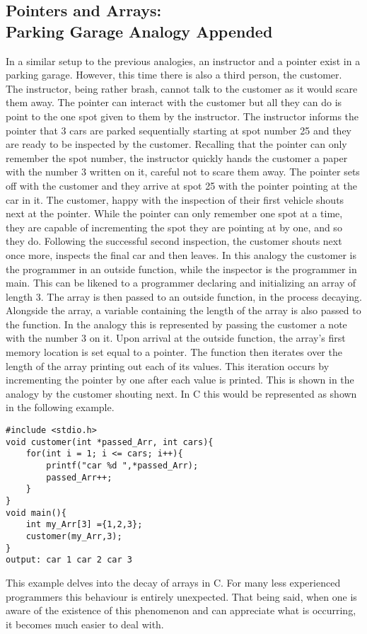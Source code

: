 \documentclass[two column, 10pt]{article}
\begin{document}
\subsection{Pointers and Arrays: \\Parking Garage Analogy Appended}
In a similar setup to the previous analogies, an instructor and a pointer exist in a parking garage. However, this time there is also a third person, the customer. The instructor, being rather brash, cannot talk to the customer as it would scare them away. The pointer can interact with the customer but all they can do is point to the one spot given to them by the instructor. The instructor informs the pointer that 3 cars are parked sequentially starting at spot number 25 and they are ready to be inspected by the customer. Recalling that the pointer can only remember the spot number, the instructor quickly hands the customer a paper with the number 3 written on it, careful not to scare them away. The pointer sets off with the customer and they arrive at spot 25 with the pointer pointing at the car in it. The customer, happy with the inspection of their first vehicle shouts next at the pointer. While the pointer can only remember one spot at a time, they are capable of incrementing the spot they are pointing at by one, and so they do. Following the successful second inspection, the customer shouts next once more, inspects the final car and then leaves. In this analogy the customer is the programmer in an outside function, while the inspector is the programmer in main. This can be likened to a programmer declaring and initializing an array of length 3. The array is then passed to an outside function, in the process decaying. Alongside the array, a variable containing the length of the array is also passed to the function. In the analogy this is represented by passing the customer a note with the number 3 on it. Upon arrival at the outside function, the array's first memory location is set equal to a pointer. The function then iterates over the length of the array printing out each of its values. This iteration occurs by incrementing the pointer by one after each value is printed. This is shown in the analogy by the customer shouting next. In C this would be represented as shown in the following example.
\begin{lstlisting}[style=CStyle,
caption={Passing an Array to a Function "customer"},captionpos=b]
#include <stdio.h>
void customer(int *passed_Arr, int cars){
    for(int i = 1; i <= cars; i++){
        printf("car %d ",*passed_Arr);
        passed_Arr++;
    }
}
void main(){
    int my_Arr[3] ={1,2,3};
    customer(my_Arr,3);
}
output: car 1 car 2 car 3
\end{lstlisting}
This example delves into the decay of arrays in C. For many less experienced programmers this behaviour is entirely unexpected. That being said, when one is aware of the existence of this phenomenon and can appreciate what is occurring, it becomes much easier to deal with. 
\end{document}
